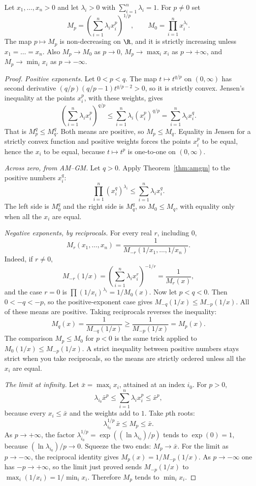 \begin{theorem}\label{thm:powermeans}
Let $x_1,\dots,x_n>0$ and let $\lambda_i>0$ with $\sum_{i=1}^n\lambda_i=1$. For $p\ne0$ set
\[
M_p=\left(\sum_{i=1}^n\lambda_ix_i^p\right)^{1/p},\qquad M_0=\prod_{i=1}^nx_i^{\lambda_i}.
\]
The map $p\mapsto M_p$ is non-decreasing on $\R$, and it is strictly increasing unless $x_1=\dots=x_n$. Also $M_p\to M_0$ as $p\to0$, $M_p\to\max_ix_i$ as $p\to+\infty$, and $M_p\to\min_ix_i$ as $p\to-\infty$.
\end{theorem}
\begin{proof}
\emph{Positive exponents.} Let $0<p<q$. The map $t\mapsto t^{q/p}$ on $(0,\infty)$ has second derivative $(q/p)(q/p-1)t^{q/p-2}>0$, so it is strictly convex. Jensen's inequality at the points $x_i^p$, with these weights, gives
\[
\left(\sum_{i=1}^n\lambda_ix_i^p\right)^{q/p}\le\sum_{i=1}^n\lambda_i(x_i^p)^{q/p}=\sum_{i=1}^n\lambda_ix_i^q.
\]
That is $M_p^q\le M_q^q$. Both means are positive, so $M_p\le M_q$. Equality in Jensen for a strictly convex function and positive weights forces the points $x_i^p$ to be equal, hence the $x_i$ to be equal, because $t\mapsto t^p$ is one-to-one on $(0,\infty)$.

\emph{Across zero, from AM--GM.} Let $q>0$. Apply Theorem~\ref{thm:amgm} to the positive numbers $x_i^q$:
\[
\prod_{i=1}^n(x_i^q)^{\lambda_i}\le\sum_{i=1}^n\lambda_ix_i^q.
\]
The left side is $M_0^q$ and the right side is $M_q^q$, so $M_0\le M_q$, with equality only when all the $x_i$ are equal.

\emph{Negative exponents, by reciprocals.} For every real $r$, including $0$,
\[
M_r(x_1,\dots,x_n)=\frac1{M_{-r}(1/x_1,\dots,1/x_n)}.
\]
Indeed, if $r\ne0$,
\[
M_{-r}(1/x)=\left(\sum_{i=1}^n\lambda_ix_i^{r}\right)^{-1/r}=\frac1{M_r(x)},
\]
and the case $r=0$ is $\prod(1/x_i)^{\lambda_i}=1/M_0(x)$. Now let $p<q<0$. Then $0<-q<-p$, so the positive-exponent case gives $M_{-q}(1/x)\le M_{-p}(1/x)$. All of these means are positive. Taking reciprocals reverses the inequality:
\[
M_q(x)=\frac1{M_{-q}(1/x)}\ge\frac1{M_{-p}(1/x)}=M_p(x).
\]
The comparison $M_p\le M_0$ for $p<0$ is the same trick applied to $M_0(1/x)\le M_{-p}(1/x)$. A strict inequality between positive numbers stays strict when you take reciprocals, so the means are strictly ordered unless all the $x_i$ are equal.

\emph{The limit at infinity.} Let $\bar x=\max_ix_i$, attained at an index $i_0$. For $p>0$,
\[
\lambda_{i_0}\bar x^p\le\sum_{i=1}^n\lambda_ix_i^p\le\bar x^p,
\]
because every $x_i\le\bar x$ and the weights add to $1$. Take $p$th roots:
\[
\lambda_{i_0}^{1/p}\,\bar x\le M_p\le\bar x.
\]
As $p\to+\infty$, the factor $\lambda_{i_0}^{1/p}=\exp((\ln\lambda_{i_0})/p)$ tends to $\exp(0)=1$, because $(\ln\lambda_{i_0})/p\to0$. Squeeze the two ends: $M_p\to\bar x$. For the limit as $p\to-\infty$, the reciprocal identity gives $M_p(x)=1/M_{-p}(1/x)$. As $p\to-\infty$ one has $-p\to+\infty$, so the limit just proved sends $M_{-p}(1/x)$ to $\max_i(1/x_i)=1/\min_i x_i$. Therefore $M_p$ tends to $\min_i x_i$.


\end{proof}
